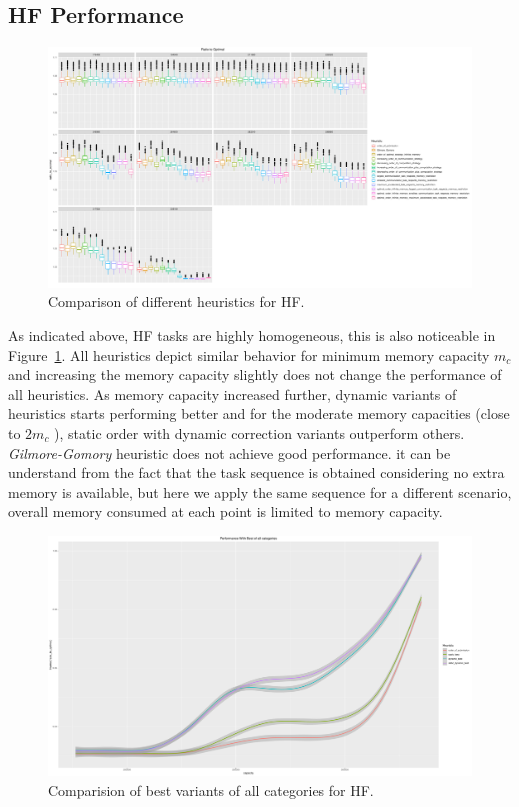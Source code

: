 \documentclass[runningheads]{llncs} %
\begin{document}
\subsection{HF Performance}	
	\begin{figure}[htb]
		\includegraphics[scale=0.3]{../ExperimentalResults/ratio_to_optimal_hf.pdf}
		\caption{Comparison of different heuristics for HF.}
		\label{fig:ratio_to_optimal_hf}
	\end{figure}
 As indicated above, HF tasks are highly homogeneous, this is also noticeable in Figure~\ref{fig:ratio_to_optimal_hf}. All heuristics depict similar behavior for minimum memory capacity $m_c$  and  increasing the memory capacity slightly does not change the performance of all heuristics. As memory capacity increased further, dynamic variants of heuristics starts performing better and for the moderate memory capacities (close to $2m_c$ ), static order with dynamic correction variants outperform others. \textit{Gilmore-Gomory} heuristic does not achieve good performance. it can be understand from the fact that the task sequence is obtained considering no extra memory is available, but here we apply the same sequence for a different scenario,  overall memory consumed at each point is limited to memory capacity.


	\begin{figure}[htb]
	\includegraphics[scale=0.25]{../ExperimentalResults/inverse_ratio_to_optimal_hf-best.pdf}
	\caption{Comparision of best variants of all categories for HF.}
	\label{fig:ratio_to_optimal_best_hf}
	\end{figure}
\end{document}
